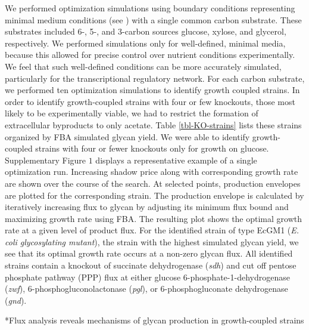 \documentclass[12pt]{article}
\makeatletter
\renewcommand\subsection{\@startsection
	{subsection}{2}{0mm}
	{-0.05in}
	{-0.5\baselineskip}
	{\normalfont\normalsize\bfseries}}
\makeatother
\begin{document}
We performed optimization simulations using boundary conditions representing minimal medium conditions (see \cite{2007-feist-reed-hatzimanikatis-palsson-MolSysBio}) with a single common carbon substrate. 
These substrates included 6-, 5-, and 3-carbon sources glucose, xylose, and glycerol, respectively. 
We performed simulations only for well-defined, minimal media, because  this allowed for precise control over nutrient conditions experimentally. 
We feel that such well-defined conditions can be more accurately simulated, particularly for the transcriptional regulatory network. 
For each carbon substrate, we performed ten optimization simulations to identify growth coupled strains. 
In order to identify growth-coupled strains with four or few knockouts, those most likely to be experimentally viable, we had to restrict the formation of extracellular byproducts to only acetate. 
Table \ref{tbl-KO-strains} lists these strains organized by FBA simulated glycan yield. 
We were able to identify growth-coupled strains with four or fewer knockouts only for growth on glucose. 
Supplementary Figure $1$ displays a representative example of a single optimization run. 
Increasing shadow price along with corresponding growth rate are shown over the course of the search. 
At selected points, production envelopes are plotted for the corresponding strain. 
The production envelope is calculated by iteratively increasing flux to glycan by adjusting its minimum flux bound and maximizing growth rate using FBA. 
The resulting plot shows the optimal growth rate at a given level of product flux. 
For the identified strain of type EcGM1 (\textit{E. coli glycosylating mutant}), the strain with the highest simulated glycan yield, we see that its optimal growth rate occurs at a non-zero glycan flux. 
All identified strains contain a knockout of succinate dehydrogenase (\textit{sdh}) and cut off pentose phosphate pathway (PPP) flux at either glucose 6-phosphate-1-dehydrogenase (\textit{zwf}), 6-phosphogluconolactonase (\textit{pgl}), or 6-phosphogluconate dehydrogenase (\textit{gnd}). 

\subsection*{Flux analysis reveals mechanisms of glycan production in growth-coupled strains}
\end{document}

